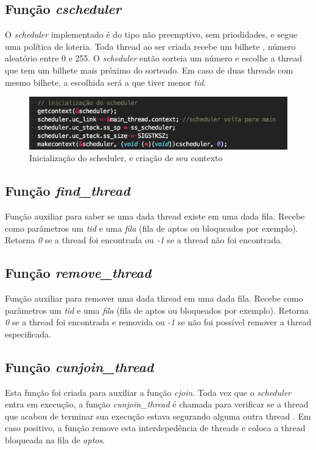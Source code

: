 \documentclass{article}
\begin{document}
\subsection{Função \textit{cscheduler}}
O \textit{scheduler} implementado é do tipo não preemptivo, sem priodidades, e segue uma política de loteria. Toda thread ao ser criada recebe um bilhete \footnotemark, número aleatório entre 0 e 255. O \textit{scheduler} então sorteia um número e escolhe a thread que tem um bilhete mais próximo do sorteado. Em caso de duas threads com mesmo bilhete, a escolhida será a  que tiver menor \textit{tid}.

\begin{figure}[h]
    \centering
    \includegraphics[scale=0.4]{scheduler.png}
    \caption{Inicialização do scheduler, e criação de seu contexto}
    \label{fig:sym4}
\end{figure}

\subsection{Função \textit{find\_thread}}
Função auxiliar para saber se uma dada thread existe em uma dada fila. Recebe como parâmetros um \textit{tid} e uma \textit{fila} (fila de aptos ou bloqueados por exemplo). Retorna \textit{0} se a thread foi encontrada ou \textit{-1} se a thread não foi encontrada.

\subsection{Função \textit{remove\_thread}}
Função auxiliar para remover uma dada thread em uma dada fila. Recebe como parâmetros um \textit{tid} e uma \textit{fila} (fila de aptos ou bloqueados por exemplo). Retorna \textit{0} se a thread foi encontrada e removida ou \textit{-1} se não foi possível remover a thread especificada.

\subsection{Função \textit{cunjoin\_thread}}
Esta função foi criada para auxiliar a função \textit{cjoin}. Toda vez que o \textit{scheduler} entra em execução, a função \textit{cunjoin\_thread} é chamada para verificar se a thread que acabou de terminar sua execução estava segurando alguma outra thread \footnotemark. Em caso positivo, a função remove esta interdepedência de threads e coloca a thread bloqueada na fila de \textit{aptos}.
\end{document}

